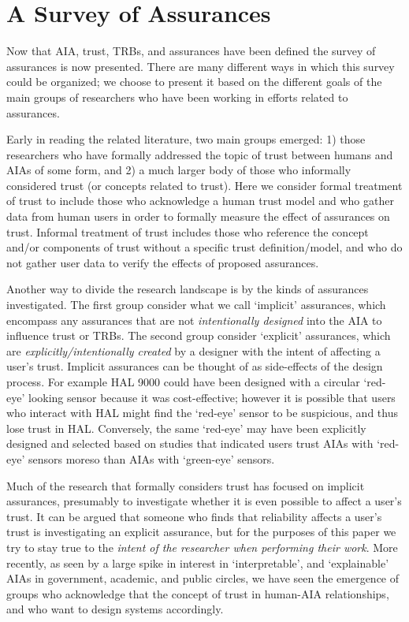 

\section{A Survey of Assurances} \label{sec:survey}
Now that AIA, trust, TRBs, and assurances have been defined the survey of assurances is now presented. There are many different ways in which this survey could be organized; we choose to present it based on the different goals of the main groups of researchers who have been working in efforts related to assurances.

Early in reading the related literature, two main groups emerged: 1) those researchers who have formally addressed the topic of trust between humans and AIAs of some form, and 2) a much larger body of those who informally considered trust (or concepts related to trust). Here we consider formal treatment of trust to include those who acknowledge a human trust model and who gather data from human users in order to formally measure the effect of assurances on trust. Informal treatment of trust includes those who reference the concept and/or components of trust without a specific trust definition/model, and who do not gather user data to verify the effects of proposed assurances. 

Another way to divide the research landscape is by the kinds of assurances investigated. 
The first group consider what we call `implicit' assurances, which encompass any assurances that are not \emph{intentionally designed} into the AIA to influence trust or TRBs. The second group consider `explicit' assurances, which are \emph{explicitly/intentionally created} by a designer with the intent of affecting a user's trust. 
Implicit assurances can be thought of as side-effects of the design process. 
For example HAL 9000 could have been designed with a circular `red-eye' looking sensor because it was cost-effective; however it is possible that users who interact with HAL might find the `red-eye' sensor to be suspicious, and thus lose trust in HAL. 
Conversely, the same `red-eye' may have been explicitly designed and selected based on studies that indicated users trust AIAs with `red-eye' sensors moreso than AIAs with `green-eye' sensors.

Much of the research that formally considers trust has focused on implicit assurances, presumably to investigate whether it is even possible to affect a user's trust. It can be argued that someone who finds that reliability affects a user's trust is investigating an explicit assurance, but for the purposes of this paper we try to stay true to the \emph{intent of the researcher when performing their work}. More recently, as seen by a large spike in interest in `interpretable', and `explainable' AIAs in government, academic, and public circles, we have seen the emergence of groups who acknowledge that the concept of trust in human-AIA relationships, and who want to design systems accordingly.

